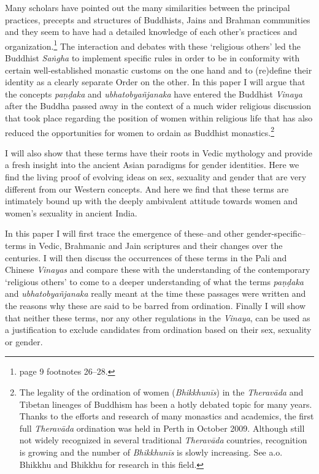 Many scholars have pointed out the many similarities between the principal practices, precepts and structures of Buddhists, Jains and Brahman communities and they seem to have had a detailed knowledge of each other's practices and organization.\footnote{\cite{maes2016} page 9 footnotes 26–28.} The interaction and debates with these `religious others' led the Buddhist \textit{Saṅgha} to implement specific rules in order to be in conformity with certain well-established monastic customs on the one hand and to (re)define their identity as a clearly separate Order on the other. In this paper I will argue that the concepts \textit{paṇḍaka} and \textit{ubhatob­yañ­janaka} have entered the Buddhist \textit{Vinaya} after the Buddha passed away in the context of a much wider religious discussion that took place regarding the position of women within religious life that has also reduced the opportunities for women to ordain as Buddhist monastics.\footnote{The legality of the ordination of women (\textit{Bhikkhunīs}) in the \textit{Theravāda} and Tibetan lineages of Buddhism has been a hotly debated topic for many years. Thanks to the efforts and research of many monastics and academics, the first full \textit{Theravāda} ordination was held in Perth in October 2009. Although still not widely recognized in several traditional \textit{Theravāda} countries, recognition is growing and the number of \textit{Bhikkhunīs} is slowly increasing. See a.o. Bhikkhu \cite{sujato2009} and Bhikkhu \cite{analayo2013} for research in this field.}

I will also show that these terms have their roots in Vedic mythology and provide a fresh insight into the ancient Asian paradigms for gender identities. Here we find the living proof of evolving ideas on sex, sexuality and gender that are very different from our Western concepts. And here we find that these terms are intimately bound up with the deeply ambivalent attitude towards women and women's sexuality in ancient India.

In this paper I will first trace the emergence of these--and other gender-specific--terms in Vedic, Brahmanic and Jain scriptures and their changes over the centuries. I will then discuss the occurrences of these terms in the Pali and Chinese \textit{Vinayas} and compare these with the understanding of the contemporary `religious others' to come to a deeper understanding of what the terms \textit{paṇḍaka} and \textit{ubhatob­yañ­janaka} really meant at the time these passages were written and the reasons why these are said to be barred from ordination. Finally I will show that neither these terms, nor any other regulations in the \textit{Vinaya}, can be used as a justification to exclude candidates from ordination based on their sex, sexuality or gender.
